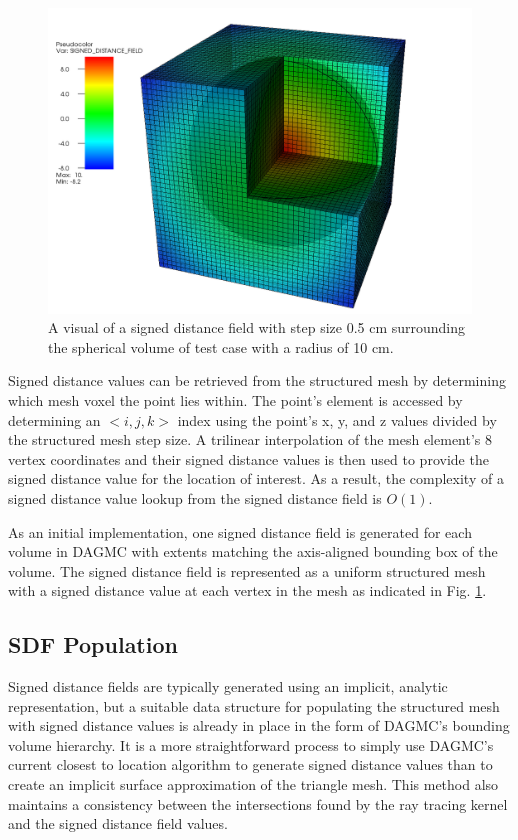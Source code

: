 \begin{figure}
  \begin{center}
  \includegraphics[scale=0.35]{../images/sdf_sphere.png}
  \caption{A visual of a signed distance field with step size 0.5 cm surrounding
    the spherical volume of test case with a radius of 10 cm.}
  \end{center}
  \label{fig:sdf_sphere}
\end{figure}

Signed distance values can be retrieved from the structured mesh by determining
which mesh voxel the point lies within. The point's element is accessed by
determining an $<i,j,k>$ index using the point's x, y, and z values divided by
the structured mesh step size. A trilinear interpolation of the mesh element's 8
vertex coordinates and their signed distance values is then used to provide the
signed distance value for the location of interest. As a result, the complexity
of a signed distance value lookup from the signed distance field is
$O(1)$.

As an initial implementation, one signed distance field is generated for each
volume in DAGMC with extents matching the axis-aligned bounding box of the
volume. The signed distance field is represented as a uniform structured mesh
with a signed distance value at each vertex in the mesh as indicated in Fig.
\ref{fig:sdf_sphere}.

\subsection{SDF Population}

Signed distance fields are typically generated using an implicit, analytic
representation, but a suitable data structure for populating the structured mesh
with signed distance values is already in place in the form of DAGMC's bounding
volume hierarchy. It is a more straightforward process to simply use DAGMC's
current closest to location algorithm to generate signed distance values than to
create an implicit surface approximation of the triangle mesh. This method also
maintains a consistency between the intersections found by the ray tracing
kernel and the signed distance field values.

